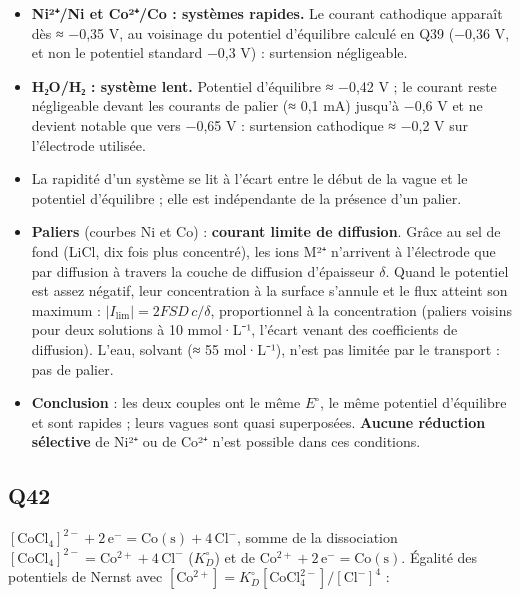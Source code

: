 \documentclass[11pt,a4paper]{article}
\providecommand{\tightlist}{\setlength{\itemsep}{0pt}\setlength{\parskip}{0pt}}
\newcommand{\equationajustee}[1]{%
  \sbox{\boiteequation}{$\displaystyle #1$}%
  \ifdim\wd\boiteequation>\linewidth
    \[\resizebox{\linewidth}{!}{\usebox{\boiteequation}}\]%
  \else
    \[#1\]%
  \fi}
\begin{document}
\begin{itemize}
\tightlist
\item
  \textbf{Ni²⁺/Ni et Co²⁺/Co : systèmes rapides.} Le courant cathodique apparaît dès ≈ −0,35 V, au voisinage du potentiel d'équilibre calculé en Q39 (−0,36 V, et non le potentiel standard −0,3 V) : surtension négligeable.
\item
  \textbf{H₂O/H₂ : système lent.} Potentiel d'équilibre ≈ −0,42 V ; le courant reste négligeable devant les courants de palier (≈ 0,1 mA) jusqu'à −0,6 V et ne devient notable que vers −0,65 V : surtension cathodique ≈ −0,2 V sur l'électrode utilisée.
\item
  La rapidité d'un système se lit à l'écart entre le début de la vague et le potentiel d'équilibre ; elle est indépendante de la présence d'un palier.
\item
  \textbf{Paliers} (courbes Ni et Co) : \textbf{courant limite de diffusion}. Grâce au sel de fond (LiCl, dix fois plus concentré), les ions M²⁺ n'arrivent à l'électrode que par diffusion à travers la couche de diffusion d'épaisseur \(\delta\). Quand le potentiel est assez négatif, leur concentration à la surface s'annule et le flux atteint son maximum : \(\lvert I_{\text{lim}}\rvert=2FSD\,c/\delta\), proportionnel à la concentration (paliers voisins pour deux solutions à 10 mmol·L⁻¹, l'écart venant des coefficients de diffusion). L'eau, solvant (≈ 55 mol·L⁻¹), n'est pas limitée par le transport : pas de palier.
\item
  \textbf{Conclusion} : les deux couples ont le même \(E^\circ\), le même potentiel d'équilibre et sont rapides ; leurs vagues sont quasi superposées. \textbf{Aucune réduction sélective} de Ni²⁺ ou de Co²⁺ n'est possible dans ces conditions.
\end{itemize}

\hypertarget{q42}{%
\subsection{Q42}\label{q42}}

\([\mathrm{CoCl_4}]^{2-}+2\,\mathrm e^-=\mathrm{Co(s)}+4\,\mathrm{Cl^-}\), somme de la dissociation \([\mathrm{CoCl_4}]^{2-}=\mathrm{Co^{2+}}+4\,\mathrm{Cl^-}\) (\(K_D^\circ\)) et de \(\mathrm{Co^{2+}}+2\,\mathrm e^-=\mathrm{Co(s)}\). Égalité des potentiels de Nernst avec \([\mathrm{Co^{2+}}]=K_D^\circ[\mathrm{CoCl_4^{2-}}]/[\mathrm{Cl^-}]^4\) :

\equationajustee{\boxed{E^\circ([\mathrm{CoCl_4}]^{2-}/\mathrm{Co})=E^\circ(\mathrm{Co^{2+}/Co})+\frac{0{,}06}{2}\log K_D^\circ}}
\end{document}
